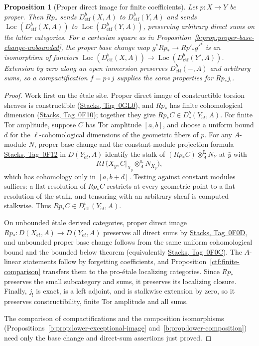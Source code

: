 \documentclass[11pt,a4paper]{article}
\numberwithin{equation}{section}
\newtheorem{proposition}[theorem]{Proposition}
\theoremstyle{definition}
\theoremstyle{remark}
\newcommand{\Dbc}{D^b_c}
\newcommand{\Loc}{\operatorname{Loc}}
\newcommand{\et}{\acute{e}t}
\newcommand{\stacks}[1]{\href{https://stacks.math.columbia.edu/tag/#1}{\textnormal{Stacks, Tag~#1}}}
\newcommand{\Dctf}{D^b_{\mathrm{ctf}}}
\begin{document}
\begin{proposition}[Proper direct image for finite coefficients]
\label{ctf:finite-proper}
Let $p:X\to Y$ be proper. Then $Rp_*$ sends $\Dctf(X,A)$ to
$\Dctf(Y,A)$ and sends $\Loc(\Dctf(X,A))$ to $\Loc(\Dctf(Y,A))$,
preserving arbitrary direct sums on the latter categories. For a cartesian square as in
Proposition~\ref{b:prop:proper-base-change-unbounded}, the proper
base change map $g^*Rp_*\to Rp'_*g'^*$ is an isomorphism of functors
$\Loc(\Dctf(X,A))\to\Loc(\Dctf(Y',A))$. Extension by zero along an
open immersion preserves $\Dctf(-,A)$ and arbitrary sums, so a
compactification $f=p\circ j$ supplies the same properties for $Rp_*j_!$.
\end{proposition}
\begin{proof}
Work first on the \'etale site. Proper direct image of constructible
torsion sheaves is constructible (\stacks{0GL0}), and $Rp_*$ has finite
cohomological dimension (\stacks{0F10}); together they give
$Rp_*C\in\Dbc(Y_{\et},A)$. For finite Tor amplitude, suppose $C$
has Tor amplitude $[a,b]$, and choose a uniform bound $d$ for the
$\ell$-cohomological dimensions of the geometric fibers of $p$.
For any $A$-module $N$, proper base change and the constant-module
projection formula \stacks{0F12} in $D(Y_{\et},A)$ identify the stalk of
$(Rp_*C)\otimes_A^{\mathbf L}N_Y$ at $\bar y$ with
\[
 R\Gamma\bigl(X_{\bar y},
       C|_{X_{\bar y}}\otimes_A^{\mathbf L}N_{X_{\bar y}}\bigr),
\]
which has cohomology only in $[a,b+d]$. Testing against constant
modules suffices: a flat resolution of $Rp_*C$ restricts at every
geometric point to a flat resolution of the stalk, and tensoring with
an arbitrary sheaf is computed stalkwise. Thus
$Rp_*C\in\Dctf(Y_{\et},A)$.

On unbounded \'etale derived categories, proper direct image
$Rp_*\colon D(X_{\et},A)\to D(Y_{\et},A)$ preserves all direct sums by \stacks{0F0D}, and unbounded proper base change
follows from the same uniform cohomological bound and the bounded below
theorem (equivalently \stacks{0F0C}). The $A$-linear statements follow
by forgetting coefficients, and Proposition~\ref{ctf:finite-comparison}
transfers them to the pro-\'etale localizing categories. Since $Rp_*$
preserves the small subcategory and sums, it preserves its localizing
closure. Finally, $j_!$ is exact, is a left adjoint, and is stalkwise
extension by zero, so it preserves constructibility, finite Tor
amplitude and all sums.

The comparison of compactifications and the composition isomorphisms
(Propositions~\ref{b:prop:lower-exceptional-image}
and~\ref{b:prop:lower-composition}) need only the base change and
direct-sum assertions just proved.
\end{proof}
\end{document}
